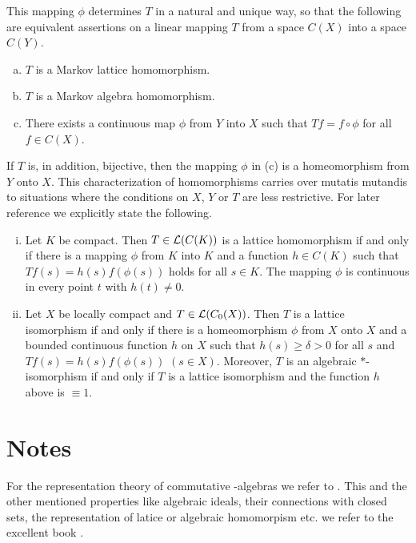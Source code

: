 This mapping $\phi$ determines $T$ in a natural and unique way, so that the following are equivalent assertions on a linear mapping $T$ from a space $C(X)$ into a space $C(Y)$.
\begin{enumerate}[(a)]
\item 
	$T$ is a Markov lattice homomorphism.
\item 
	$T$ is a Markov algebra homomorphism.
\item 
	There exists a continuous map $\phi$ from $Y$ into $X$ such that $Tf = f \circ \phi$ for all $f \in 	C(X)$.
\end{enumerate}
If $T$ is, in addition, bijective, then the mapping $\phi$ in (c) is a homeomorphism from $Y$ onto $X$.
This characterization of homomorphisms carries over mutatis mutandis to situations where the conditions on $X$, $Y$ or $T$ are less restrictive.
For later reference we explicitly state the following.
\begin{enumerate}[(i)]
\item 
	Let $K$ be compact. Then $ T \in \mathcal{L}(C(K)) $ is a lattice homomorphism if and only if there is a mapping 
$\phi$ from $K$ into $K$ and a function $h \in C(K)$ such that $Tf(s) = h(s)f(\phi(s))$ holds for all $s \in K$.
The mapping $\phi$ is continuous in every point $t$ with $h(t) \neq 0$.

\item 
	Let $X$ be locally compact and $T \in \mathcal{L}(C_{0}(X))$.
Then $T$ is a lattice isomorphism if and only if there is a homeomorphism $\phi$ from $X$ onto $X$ and a bounded continuous function $h$ on $X$ such that $h(s) \geq \delta > 0$ for all $s$ and $Tf(s) = h(s)f(\phi(s))$ $(s \in X)$.
Moreover, $T$ is an algebraic $*$-isomorphism if and only if $T$ is a lattice isomorphism and the function $h$ above is $\equiv 1$.
\end{enumerate}

\section*{Notes}

For the representation theory of commutative \CA-algebras we refer to \citet{takesaki:1979}. 
This and the other mentioned properties like algebraic ideals, their connections with closed sets, the representation of latice or algebraic homomorpism etc. we refer to the excellent book \citet{semadeni:1971}.

\RaggedRight


